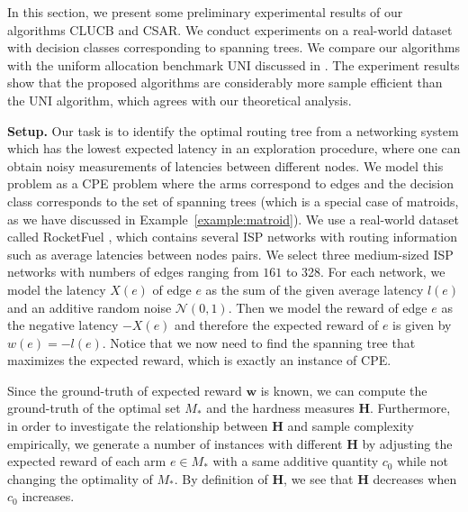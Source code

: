 \documentclass{article}
\newcommand{\Algorithm}{{\small \textsf{CLUCB}}\xspace}
\newcommand{\AlgorithmBud}{{\small \textsf{CSAR}}\xspace}
\newcommand{\Uniform}{{\small \textsf{UNI}}\xspace}
\newcommand{\Problem}{{CPE}\xspace}
\renewcommand{\vec}[1]{\boldsymbol{#1}}
\begin{document}
In this section, we present some preliminary experimental results of our algorithms \Algorithm and \AlgorithmBud. 
We conduct experiments on a real-world dataset with decision classes corresponding to spanning trees.
We compare our algorithms with the uniform allocation benchmark \Uniform discussed in .
The experiment results show that the proposed algorithms are considerably more sample efficient than the \Uniform algorithm, which agrees with our theoretical analysis.


\newcommand{\imgsize}{0.30}

\textbf{Setup.} 
Our task is to identify the optimal routing tree from a networking system which has the lowest expected latency  in an exploration procedure, where one can obtain noisy measurements of latencies between different nodes.
We model this problem as a \Problem problem where the arms correspond to edges and the decision class corresponds to the set of spanning trees (which is a special case of matroids, as we have discussed in Example~\ref{example:matroid}).
We use a real-world dataset called RocketFuel \citep{spring2002measuring}, which contains several ISP networks with routing information such as average latencies between nodes pairs. 
We select three medium-sized ISP networks with numbers of edges ranging from $161$ to 328.
For each network, we model the latency $X(e)$ of edge $e$ as the sum of the given average latency $l(e)$ and an additive random noise $\mathcal N(0, 1)$.
Then we model the reward of edge $e$ as the negative latency $-X(e)$ and therefore the expected reward of $e$ is given by $w(e) = -l(e)$.
Notice that we now need to find the spanning tree that maximizes the expected reward, which is exactly an instance of \Problem. 

Since the ground-truth of expected reward $\vec w$ is known, we can compute the ground-truth of the optimal set $M_*$ and the hardness measures $\mathbf H$.
Furthermore, in order to investigate the relationship between $\mathbf H$ and sample complexity empirically, we generate a number of instances with different $\mathbf H$ by adjusting the expected reward of each arm $e\in M_*$ with a same additive quantity $c_0$ while not changing the optimality of $M_*$.
By definition of $\mathbf H$, we see that $\mathbf H$ decreases when $c_0$ increases.
\end{document}
